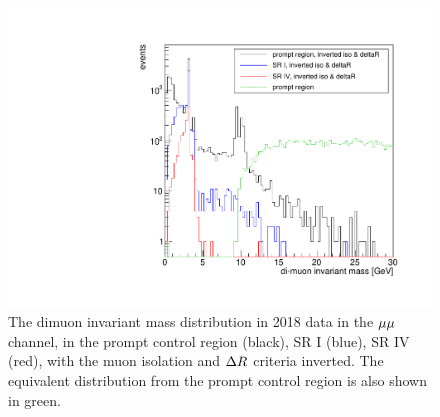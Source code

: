 \begin{figure}[htbp]
\centering
\includegraphics[scale=0.4]{figures/bg/mumuInvMass_comparison.pdf}
\caption{The dimuon invariant mass distribution in 2018 data in the ${\mu}{\mu}$ channel, in the prompt control region (black), SR I (blue), SR IV (red), with the muon isolation and $\Delta R$ criteria inverted. The equivalent distribution from the prompt control region is also shown in green. 
}
\label{mumu_inv_mass_inverted_iso_lo}
\end{figure}